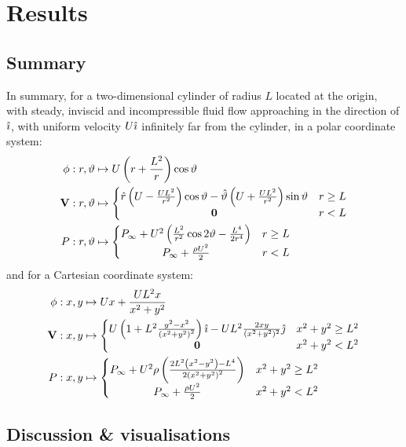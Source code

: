 \section{Results}
\subsection{Summary}
In summary, for a two-dimensional cylinder of radius $L$ located at the origin, with steady, inviscid and incompressible fluid flow approaching
in the direction of $\hat{\imath}$, with uniform velocity $U\hat{\imath}$ infinitely far from the cylinder, in a polar coordinate system:
\begin{align*}
	\phi:r,\vartheta&\mapsto U\left(r+\frac{L^2}{r}\right)\cos\vartheta\\
	\mathbf{V}:r,\vartheta&\mapsto\left\{\begin{matrix}
		\hat{r}\left(U-\frac{UL^2}{r^{2}}\right)\cos\vartheta-\hat{\vartheta}\left(U+\frac{UL^2}{r^{2}}\right)\sin\vartheta&r\geq L\\
		\mathbf{0}&r<L
	\end{matrix}\right.\\
	P:r,\vartheta&\mapsto\left\{\begin{matrix}
		P_\infty+U^2\left(\frac{L^2}{r^2}\cos2\vartheta-\frac{L^4}{2r^4}\right) & r\geq L\\
		P_\infty+\frac{\rho U^2}{2} & r<L
	\end{matrix}\right.
\end{align*}
and for a Cartesian coordinate system:
\begin{align*}
	\phi:x,y&\mapsto Ux+\frac{UL^2x}{x^2+y^2}\\
	\mathbf{V}:x,y&\mapsto\left\{\begin{matrix}
		U\left(1+L^2\frac{y^2-x^2}{\left(x^2+y^2\right)^2}\right)\hat{\imath}-UL^2\frac{2xy}{(x^2+y^2)^2}\hat{\jmath}&x^2+y^2\geq L^2\\
		\mathbf{0}&x^2+y^2<L^2
	\end{matrix}\right.\\
	P:x,y&\mapsto\left\{\begin{matrix}
		P_\infty+U^2\rho\left(\frac{2L^2\left(x^2-y^2\right)-L^4}{2\left(x^2+y^2\right)^2}\right) & x^2+y^2\geq L^2\\
		P_\infty+\frac{\rho U^2}{2} & x^2+y^2<L^2
	\end{matrix}\right.
\end{align*}

\subsection{Discussion \& visualisations}
